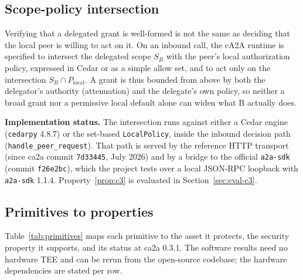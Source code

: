 \subsection{Scope-policy intersection}\label{subsec:cedar}

Verifying that a delegated grant is well-formed is not the same as deciding that the local peer
is willing to act on it. On an inbound call, the cA2A runtime is specified to intersect the
delegated scope $S_B$ with the peer's local authorization policy, expressed in Cedar
\citep{cedar2023} or as a simple allow set, and to act only on the intersection
$S_B \cap P_{\text{local}}$. A grant is
thus bounded from above by both the delegator's authority (attenuation) and the delegate's own
policy, so neither a broad grant nor a permissive local default alone can widen what B actually
does.

\textbf{Implementation status.} The intersection runs against either a Cedar engine
(\texttt{cedarpy} 4.8.7) or the set-based \texttt{LocalPolicy}, inside the inbound decision
path (\texttt{handle\_peer\_request}). That path is served by the reference HTTP transport
(since ca2a commit \texttt{7d33445}, July 2026) and by a bridge to the official \texttt{a2a-sdk}
(commit \texttt{f26e2bc}), which the project tests over a local JSON-RPC loopback with
\texttt{a2a-sdk} 1.1.4. Property~\ref{prop:c3} is evaluated in Section~\ref{sec:eval-c3}.

\subsection{Primitives to properties}

Table~\ref{tab:primitives} maps each primitive to the asset it protects, the security property
it supports, and its status at ca2a 0.3.1. The software results need no hardware TEE and can be
rerun from the open-source codebase; the hardware dependencies are stated per row.

